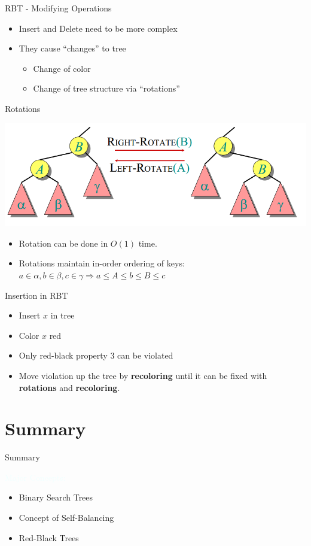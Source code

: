 \documentclass{beamer}
\newcommand{\tblue}[1]{{\Large {\textcolor{azure}{#1}}}}
\begin{document}
\begin{frame}{RBT - Modifying Operations}
    \begin{itemize}
        \item Insert and Delete need to be more complex
        \item They cause ``changes'' to tree
        \begin{itemize}
            \item Change of color
            \item Change of tree structure via ``rotations''
        \end{itemize}
    \end{itemize}
\end{frame}


\begin{frame}{Rotations}
    \begin{center}
        \includegraphics[scale=0.4]{rotationsEg.png}
    \end{center}
    \begin{itemize}
        \item Rotation can be done in $O(1)$ time. 
        \item Rotations maintain in-order ordering of keys: 
            $a \in \alpha, b \in \beta, c \in \gamma \Rightarrow a \leq A \leq b \leq B \leq c$
    \end{itemize}
\end{frame}


\begin{frame}{Insertion in RBT}
    \begin{itemize}
        \item Insert $x$ in tree
        \item Color $x$ red
        \item Only red-black property $3$ can be violated
        \item Move violation up the tree by {\bf recoloring} until it can be fixed with {\bf rotations} and {\bf recoloring}.
    \end{itemize}
\end{frame}

\section{Summary}
\begin{frame}{Summary}

\tblue{Major Concepts:}
\begin{itemize}
\item Binary Search Trees
\item Concept of Self-Balancing
\item Red-Black Trees
\end{itemize}
\end{frame}
\end{document}
